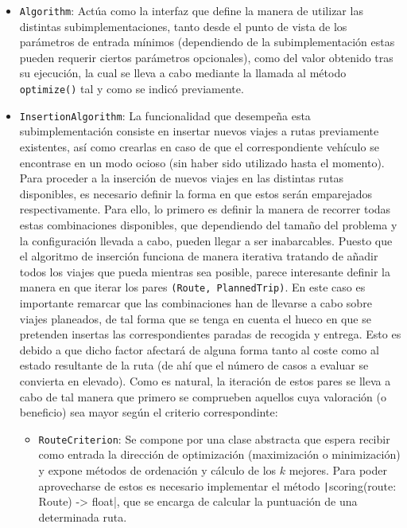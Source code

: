 \documentclass{subfiles}
\begin{document}
          \begin{itemize}

              \item \texttt{Algorithm}: Actúa como la interfaz que define la manera de utilizar las distintas subimplementaciones, tanto desde el punto de vista de los parámetros de entrada mínimos (dependiendo de la subimplementación estas pueden requerir ciertos parámetros opcionales), como del valor obtenido tras su ejecución, la cual se lleva a cabo mediante la llamada al método \texttt{optimize()} tal y como se indicó previamente.

              \item \texttt{InsertionAlgorithm}: La funcionalidad que desempeña esta subimplementación consiste en insertar nuevos viajes a rutas previamente existentes, así como crearlas en caso de que el correspondiente vehículo se encontrase en un modo ocioso (sin haber sido utilizado hasta el momento). Para proceder a la inserción de nuevos viajes en las distintas rutas disponibles, es necesario definir la forma en que estos serán emparejados respectivamente. Para ello, lo primero es definir la manera de recorrer todas estas combinaciones disponibles, que dependiendo del tamaño del problema y la configuración llevada a cabo, pueden llegar a ser inabarcables. Puesto que el algoritmo de inserción funciona de manera iterativa tratando de añadir todos los viajes que pueda mientras sea posible, parece interesante definir la manera en que iterar los pares \texttt{(Route, PlannedTrip)}. En este caso es importante remarcar que las combinaciones han de llevarse a cabo sobre viajes planeados, de tal forma que se tenga en cuenta el hueco en que se pretenden insertas las correspondientes paradas de recogida y entrega. Esto es debido a que dicho factor afectará de alguna forma tanto al coste como al estado resultante de la ruta (de ahí que el número de casos a evaluar se convierta en elevado). Como es natural, la iteración de estos pares se lleva a cabo de tal manera que primero se comprueben aquellos cuya valoración (o beneficio) sea mayor según el criterio correspondinte: 

                  \begin{itemize}

                      \item \texttt{RouteCriterion}: Se compone por una clase abstracta que espera recibir como entrada la dirección de optimización (maximización o minimización) y expone métodos de ordenación y cálculo de los $k$ mejores. Para poder aprovecharse de estos es necesario implementar el método \texttt|scoring(route: Route) -> float|, que se encarga de calcular la puntuación de una determinada ruta.
                  

\end{itemize}
\end{itemize}
\end{document}
